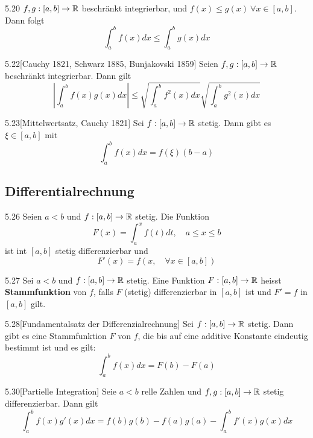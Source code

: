\begin{satz}{5.20}
    $f, g: [a,b] \to \mathbb{R}$ beschränkt integrierbar, und $f(x) \le g(x)\ \forall x \in [a, b]$.
    Dann folgt
    \[ \int_a^b f(x)dx \le \int_a^b g(x)dx \]
\end{satz}

\begin{satz}{5.22}[Cauchy 1821, Schwarz 1885, Bunjakovski 1859]
    Seien $f,g: [a,b] \to \mathbb{R}$ beschränkt integrierbar. Dann gilt
    \[ \left| \int_a^b f(x)g(x) dx \right| \le \sqrt{\int_a^b f^2(x)dx} \sqrt{\int_a^b g^2(x)dx} \]
\end{satz}

\begin{satz}{5.23}[Mittelwertsatz, Cauchy 1821]
    Sei $f: [a,b] \to \mathbb{R}$ stetig. Dann gibt es $\xi \in [a,b]$ mit
    \[ \int_a^b f(x) dx = f(\xi)(b-a) \]
\end{satz}

\subsection{Differentialrechnung}

\begin{satz}{5.26}
    Seien $a < b$ und $f: [a, b] \to \mathbb{R}$ stetig. Die Funktion
    \[ F(x) = \int_a^x f(t) dt,\quad a \le x \le b \]
    ist int $[a, b]$ stetig differenzierbar und
    \[ F'(x) = f(x, \quad \forall x \in [a, b]) \]
\end{satz}

\begin{definition}{5.27}
    Sei $a < b$ und $f: [a,b] \to \mathbb{R}$ stetig. Eine Funktion $F: [a,b ] \to \mathbb{R}$ heisst \textbf{Stammfunktion} von $f$, falls $F$
    (stetig) differenzierbar in $[a, b]$ ist und $F' = f$ in $[a, b]$ gilt.
\end{definition}

\begin{satz}{5.28}[Fundamentalsatz der Differenzialrechnung]
    Sei $f: [a,b] \to \mathbb{R}$ stetig. Dann gibt es eine Stammfunktion $F$ von $f$, die bis auf eine additive Konstante eindeutig bestimmt ist und es gilt:
    \[ \int_a^b f(x)dx = F(b) - F(a) \]
\end{satz}

\begin{satz}{5.30}[Partielle Integration]
    Seie $a<b$ relle Zahlen und $f,g: [a,b] \to \mathbb{R}$ stetig differenzierbar. Dann gilt
    \[ \int_a^b f(x)g'(x)dx = f(b)g(b) - f(a)g(a) - \int_a^b f'(x)g(x)dx \]
\end{satz}

